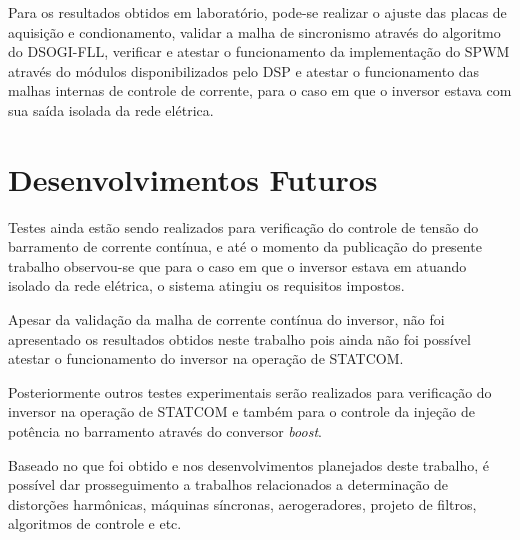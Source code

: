 Para os resultados obtidos em laboratório, pode-se realizar o ajuste das placas de aquisição e condionamento, validar a malha de sincronismo 
através do algoritmo do DSOGI-FLL, verificar e atestar o funcionamento da implementação do SPWM através do módulos 
disponibilizados pelo DSP e atestar o funcionamento das malhas internas de controle de corrente, para o caso em que o inversor 
estava com sua saída isolada da rede elétrica. 

\section{Desenvolvimentos Futuros}

Testes ainda estão sendo realizados para verificação do controle de tensão do barramento de corrente contínua, e até o momento 
da publicação do presente trabalho observou-se que para o caso em que o inversor estava em atuando isolado da rede elétrica, 
o sistema atingiu os requisitos impostos.

Apesar da validação da malha de corrente contínua do inversor, não foi apresentado os resultados obtidos neste trabalho
pois ainda não foi possível atestar o funcionamento do inversor na operação de STATCOM. 

Posteriormente outros testes experimentais serão realizados para verificação do inversor na operação de STATCOM e também 
para o controle da injeção de potência no barramento através do conversor \textit{boost}.

Baseado no que foi obtido e nos desenvolvimentos planejados deste trabalho, é possível dar prosseguimento a trabalhos relacionados a 
determinação de distorções harmônicas, máquinas síncronas, aerogeradores, projeto de filtros, algoritmos de controle e etc.